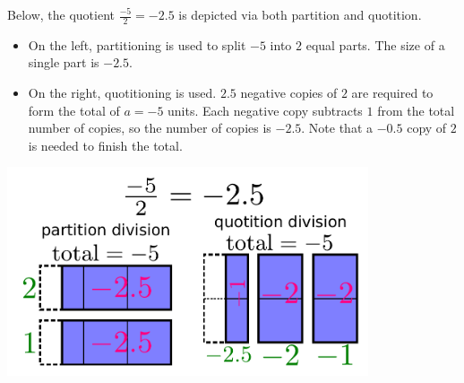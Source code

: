 \documentclass{article}
\begin{document}
\vspace{5mm}


Below, the quotient \(\frac{-5}{2} = -2.5\) is depicted via both partition and quotition. 
\begin{itemize}
\item On the left, partitioning is used to split \(-5\) into \(2\) equal parts. The size of a single part is \(-2.5\). 
\item On the right, quotitioning is used. \(2.5\) negative copies of \(2\) are required to form the total of \(a = -5\) units. Each negative copy subtracts \(1\) from the total number of copies, so the number of copies is \(-2.5\). Note that a \(-0.5\) copy of \(2\) is needed to finish the total. 
\end{itemize}
\includegraphics[width = 0.8\textwidth]{m5_div_2}

\vspace{5mm}

\end{document}
